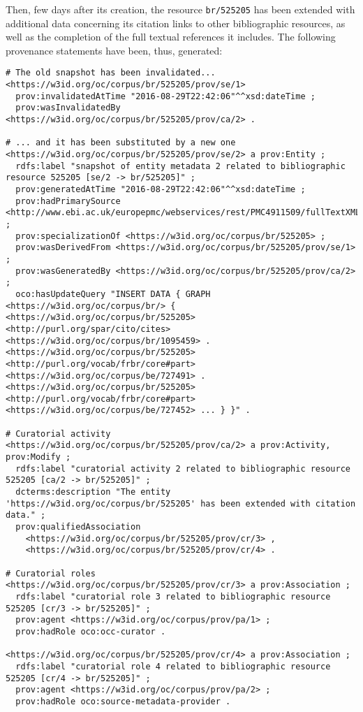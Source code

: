 \documentclass[runningheads,a4paper]{llncs}
\begin{document}
Then, few days after its creation, the resource \Verb+br/525205+ has been extended with additional data concerning its citation links to other bibliographic resources, as well as the completion of the full textual references it includes. The following provenance statements have been, thus, generated:

\begin{lstlisting}[mathescape]
# The old snapshot has been invalidated...
<https://w3id.org/oc/corpus/br/525205/prov/se/1> 
  prov:invalidatedAtTime "2016-08-29T22:42:06"^^xsd:dateTime ;
  prov:wasInvalidatedBy <https://w3id.org/oc/corpus/br/525205/prov/ca/2> .

# ... and it has been substituted by a new one
<https://w3id.org/oc/corpus/br/525205/prov/se/2> a prov:Entity ;
  rdfs:label "snapshot of entity metadata 2 related to bibliographic resource 525205 [se/2 -> br/525205]" ;
  prov:generatedAtTime "2016-08-29T22:42:06"^^xsd:dateTime ;
  prov:hadPrimarySource <http://www.ebi.ac.uk/europepmc/webservices/rest/PMC4911509/fullTextXML> ;
  prov:specializationOf <https://w3id.org/oc/corpus/br/525205> ;
  prov:wasDerivedFrom <https://w3id.org/oc/corpus/br/525205/prov/se/1> ;
  prov:wasGeneratedBy <https://w3id.org/oc/corpus/br/525205/prov/ca/2> ;
  oco:hasUpdateQuery "INSERT DATA { GRAPH <https://w3id.org/oc/corpus/br/> { <https://w3id.org/oc/corpus/br/525205> <http://purl.org/spar/cito/cites> <https://w3id.org/oc/corpus/br/1095459> . <https://w3id.org/oc/corpus/br/525205> <http://purl.org/vocab/frbr/core#part> <https://w3id.org/oc/corpus/be/727491> . <https://w3id.org/oc/corpus/br/525205> <http://purl.org/vocab/frbr/core#part> <https://w3id.org/oc/corpus/be/727452> ... } }" .

# Curatorial activity
<https://w3id.org/oc/corpus/br/525205/prov/ca/2> a prov:Activity, prov:Modify ;
  rdfs:label "curatorial activity 2 related to bibliographic resource 525205 [ca/2 -> br/525205]" ;
  dcterms:description "The entity 'https://w3id.org/oc/corpus/br/525205' has been extended with citation data." ;
  prov:qualifiedAssociation 
    <https://w3id.org/oc/corpus/br/525205/prov/cr/3> ,
    <https://w3id.org/oc/corpus/br/525205/prov/cr/4> .

# Curatorial roles
<https://w3id.org/oc/corpus/br/525205/prov/cr/3> a prov:Association ;
  rdfs:label "curatorial role 3 related to bibliographic resource 525205 [cr/3 -> br/525205]" ;
  prov:agent <https://w3id.org/oc/corpus/prov/pa/1> ;
  prov:hadRole oco:occ-curator .
  
<https://w3id.org/oc/corpus/br/525205/prov/cr/4> a prov:Association ;
  rdfs:label "curatorial role 4 related to bibliographic resource 525205 [cr/4 -> br/525205]" ;
  prov:agent <https://w3id.org/oc/corpus/prov/pa/2> ;
  prov:hadRole oco:source-metadata-provider .
\end{lstlisting}
\end{document}
